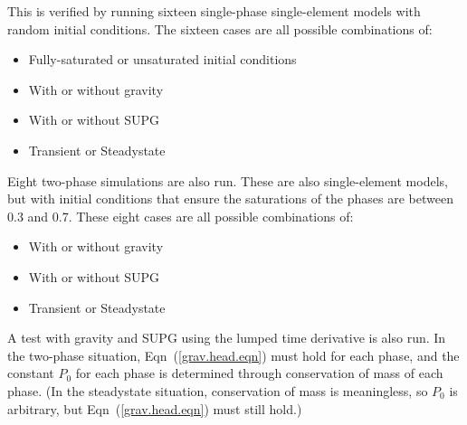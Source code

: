 \documentclass[]{scrreprt}
\begin{document}
This is verified by running sixteen single-phase single-element models
with random initial conditions.  The sixteen cases are all possible
combinations of:
\begin{itemize}
\item Fully-saturated or unsaturated initial conditions
\item With or without gravity
\item With or without SUPG
\item Transient or Steadystate
\end{itemize}
Eight two-phase simulations are also run.  These are also
single-element models, but with initial conditions that ensure the
saturations of the phases are between 0.3 and 0.7.  These eight cases
are all possible combinations of:
\begin{itemize}
\item With or without gravity
\item With or without SUPG
\item Transient or Steadystate
\end{itemize}
A test with gravity and SUPG using the lumped time derivative is also run.
In the two-phase situation, Eqn~(\ref{grav.head.eqn}) must hold for
each phase, and the constant $P_{0}$ for each phase is determined
through conservation of mass of each phase.  (In the steadystate
situation, conservation of mass is meaningless, so $P_{0}$ is
arbitrary, but Eqn~(\ref{grav.head.eqn}) must still hold.)
\end{document}
